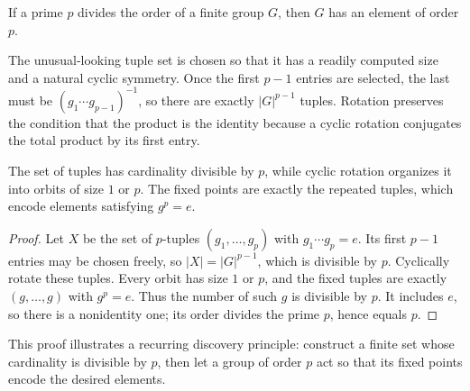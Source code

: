 \begin{theorem}[Cauchy]\label{thm:cauchy}
If a prime \(p\) divides the order of a finite group \(G\), then \(G\) has an
element of order \(p\).
\end{theorem}
The unusual-looking tuple set is chosen so that it has a readily computed size
and a natural cyclic symmetry.  Once the first \(p-1\) entries are selected,
the last must be \((g_1\cdots g_{p-1})^{-1}\), so there are exactly
\(|G|^{p-1}\) tuples.  Rotation preserves the condition that the product is
the identity because a cyclic rotation conjugates the total product by its first entry.
\begin{proofidea}
The set of tuples has cardinality divisible by \(p\), while cyclic rotation
organizes it into orbits of size \(1\) or \(p\).  The fixed points are exactly
the repeated tuples, which encode elements satisfying \(g^p=e\).
\end{proofidea}
\begin{proof}
Let \(X\) be the set of \(p\)-tuples \((g_1,\ldots,g_p)\) with
\(g_1\cdots g_p=e\). Its first \(p-1\) entries may be chosen freely, so
\(|X|=|G|^{p-1}\), which is divisible by \(p\).  Cyclically rotate these
tuples.  Every orbit has size \(1\) or \(p\), and the fixed tuples are exactly
\((g,\ldots,g)\) with \(g^p=e\). Thus the number of such \(g\) is divisible
by \(p\). It includes \(e\), so there is a nonidentity one; its order divides
the prime \(p\), hence equals \(p\).
\end{proof}

This proof illustrates a recurring discovery principle: construct a finite set
whose cardinality is divisible by \(p\), then let a group of order \(p\) act so
that its fixed points encode the desired elements.

